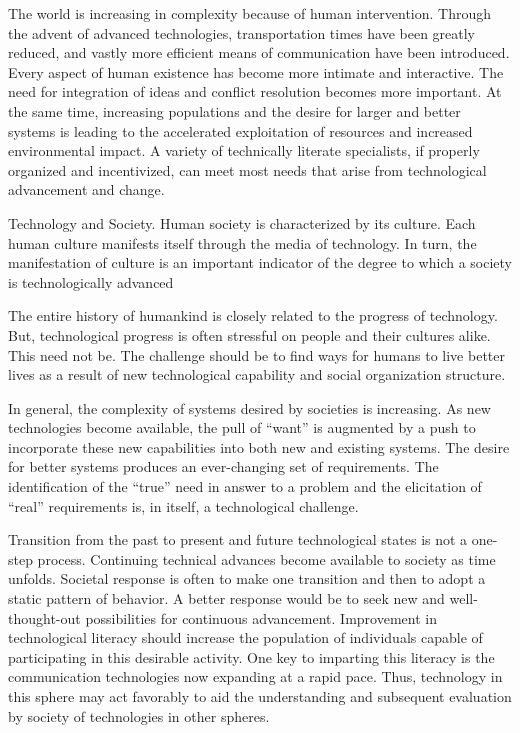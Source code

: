 The world is increasing in complexity because of human intervention. Through the advent of advanced technologies, transportation times have been greatly reduced, and vastly more efficient means of communication have been introduced. Every aspect of human existence has become more intimate and interactive. The need for integration of ideas and conflict resolution becomes more important. At the same time, increasing populations and the desire for larger and better systems is leading to the accelerated exploitation of resources and increased environmental impact. A variety of technically literate specialists, if properly organized and incentivized, can meet most needs that arise from technological advancement and change.

Technology and Society. Human society is characterized by its culture. Each human culture manifests itself through the media of technology. In turn, the manifestation of culture is an important indicator of the degree to which a society is technologically advanced

The entire history of humankind is closely related to the progress of technology. But, technological progress is often stressful on people and their cultures alike. This need not be. The challenge should be to find ways for humans to live better lives as a result of new technological capability and social organization structure.

In general, the complexity of systems desired by societies is increasing. As new technologies become available, the pull of ``want'' is augmented by a push to incorporate these new capabilities into both new and existing systems. The desire for better systems produces an ever-changing set of requirements. The identification of the ``true'' need in answer to a problem and the elicitation of ``real'' requirements is, in itself, a technological challenge.

Transition from the past to present and future technological states is not a one-step process. Continuing technical advances become available to society as time unfolds. Societal response is often to make one transition and then to adopt a static pattern of behavior. A better response would be to seek new and well-thought-out possibilities for continuous advancement. Improvement in technological literacy should increase the population of individuals capable of participating in this desirable activity. One key to imparting this literacy is the communication technologies now expanding at a rapid pace. Thus, technology in this sphere may act favorably to aid the understanding and subsequent evaluation by society of technologies in other spheres.

